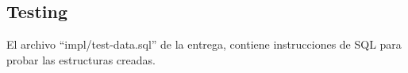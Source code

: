 \subsection{Testing}

El archivo ``impl/test-data.sql'' de la entrega, contiene instrucciones de SQL para probar las estructuras creadas.

